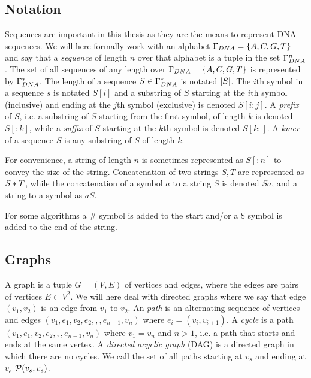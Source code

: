 \subsection{Notation}
Sequences are important in this thesis as they are the means to represent DNA-sequences. We will here formally work with an alphabet $\Gamma_{DNA} = \left\{A, C, G, T\right\}$ and say that a \emph{sequence} of length $n$ over that alphabet is a tuple in the set $\Gamma_{DNA}^n$.
The set of all sequences of any length over $\Gamma_{DNA} = \left\{A, C, G, T\right\}$ is  represented by $\Gamma_{DNA}^*$.
The length of a sequence $S \in \Gamma_{DNA}^*$ is notated $\left|S\right|$.
The $i$th symbol in a sequence $s$ is notated $S[i]$ and a substring of $S$ starting at the $i$th symbol (inclusive) and ending at the $j$th symbol (exclusive) is denoted $S[i:j]$.
A \emph{prefix} of $S$, i.e. a substring of $S$ starting from the first symbol, of length $k$ is denoted $S[:k]$, while a \emph{suffix} of $S$ starting at the $k$th symbol is denoted $S[k:]$. A \emph{kmer} of a sequence $S$ is any substring of $S$ of length $k$.

For convenience, a string of length $n$ is sometimes represented as $S[:n]$ to convey the size of the string.
Concatenation of two strings $S, T$ are represented as $S * T$, while the concatenation of a symbol $a$ to a string $S$ is denoted $Sa$, and a string to a symbol as $aS$.

For some algorithms a $\#$ symbol is added to the start and/or a $\$$ symbol is added to the end of the string.

\subsection{Graphs}
A graph is a tuple $G=(V, E)$ of vertices and edges, where the edges are pairs of vertices $E \subset V^2$.
We will here deal with directed graphs where we say that edge $(v_1, v_2)$ is an edge from $v_1$ to $v_2$.
An \emph{path} is an alternating sequence of vertices and edges $(v_1, e_1, v_2, e_2,,,e_{n-1}, v_n)$ where $e_i = (v_i, v_{i+1})$.
A \emph{cycle} is a path $(v_1, e_1, v_2, e_2,,,e_{n-1}, v_n)$ where $v_1=v_n$ and $n>1$, i.e. a path that starts and ends at the same vertex.
A \emph{directed acyclic graph} (DAG) is a directed graph in which there are no cycles.
We call the set of all paths starting at $v_s$ and ending at $v_e$ $\mathcal{P}(v_s, v_e)$.

